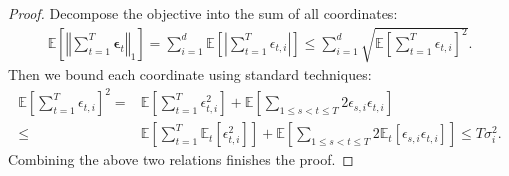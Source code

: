 \documentclass[10pt,a4paper]{amsart}
\def \E {\mathbb{E}}
\newcommand{\abs}[1]{\left|#1\right|}
\def \eps {\bm{\epsilon}}
\newcommand{\norm}[1]{\left\Vert#1\right\Vert}
\newcommand{\sqbrac}[1]{\left[#1\right]}
\begin{document}
\begin{proof}
    Decompose the objective into the sum of all coordinates:
    \begin{align*}
         \E\sqbrac{\norm{\sum_{t=1}^T\eps_t}_1}=\sum_{i=1}^d\E\sqbrac{\abs{\sum_{t=1}^T\epsilon_{t,i}}}\le\sum_{i=1}^d\sqrt{\E\sqbrac{\sum_{t=1}^T\epsilon_{t,i}}^2}.
    \end{align*}
    Then we bound each coordinate using standard techniques:
    \begin{align*}
        \E\sqbrac{\sum_{t=1}^T\epsilon_{t,i}}^2=&\E\sqbrac{\sum_{t=1}^T\epsilon_{t,i}^2}+\E\sqbrac{\sum_{1\le s<t\le T}2\epsilon_{s,i}\epsilon_{t,i}} \\\le& \E\sqbrac{\sum_{t=1}^T\E_t\sqbrac{\epsilon_{t,i}^2}}+\E\sqbrac{\sum_{1\le s<t\le T}2\E_t\sqbrac{\epsilon_{s,i}\epsilon_{t,i}}}\le T\sigma_i^2.       
    \end{align*}
    Combining the above two relations finishes the proof.
\end{proof}
\end{document}
